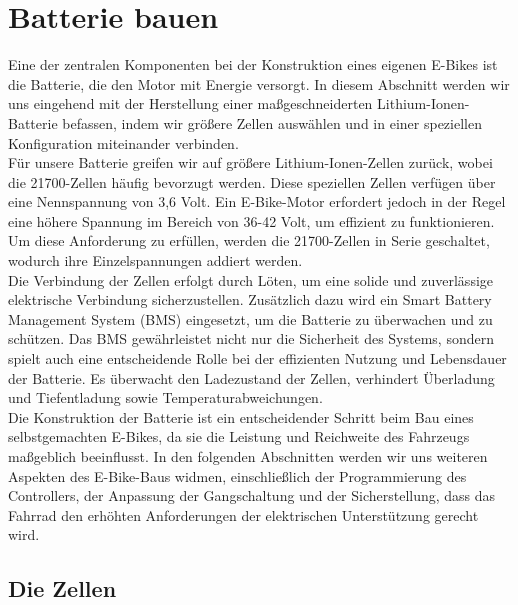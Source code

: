 \chapter{Batterie bauen}
Eine der zentralen Komponenten bei der Konstruktion eines eigenen E-Bikes ist die Batterie, die den Motor mit Energie versorgt. In diesem Abschnitt werden wir uns eingehend mit der Herstellung einer maßgeschneiderten Lithium-Ionen-Batterie befassen, indem wir größere Zellen auswählen und in einer speziellen Konfiguration miteinander verbinden.\\

Für unsere Batterie greifen wir auf größere Lithium-Ionen-Zellen zurück, wobei die 21700-Zellen häufig bevorzugt werden. Diese speziellen Zellen verfügen über eine Nennspannung von 3,6 Volt. Ein E-Bike-Motor erfordert jedoch in der Regel eine höhere Spannung im Bereich von 36-42 Volt, um effizient zu funktionieren. Um diese Anforderung zu erfüllen, werden die 21700-Zellen in Serie geschaltet, wodurch ihre Einzelspannungen addiert werden.\\

Die Verbindung der Zellen erfolgt durch Löten, um eine solide und zuverlässige elektrische Verbindung sicherzustellen. Zusätzlich dazu wird ein Smart Battery Management System (BMS) eingesetzt, um die Batterie zu überwachen und zu schützen. Das BMS gewährleistet nicht nur die Sicherheit des Systems, sondern spielt auch eine entscheidende Rolle bei der effizienten Nutzung und Lebensdauer der Batterie. Es überwacht den Ladezustand der Zellen, verhindert Überladung und Tiefentladung sowie Temperaturabweichungen.\\

Die Konstruktion der Batterie ist ein entscheidender Schritt beim Bau eines selbstgemachten E-Bikes, da sie die Leistung und Reichweite des Fahrzeugs maßgeblich beeinflusst. In den folgenden Abschnitten werden wir uns weiteren Aspekten des E-Bike-Baus widmen, einschließlich der Programmierung des Controllers, der Anpassung der Gangschaltung und der Sicherstellung, dass das Fahrrad den erhöhten Anforderungen der elektrischen Unterstützung gerecht wird.\\ 
\section{Die Zellen}


